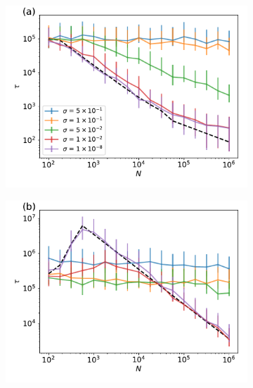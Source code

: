 \documentclass[10pt,twocolumn,twoside]{gsajnl}
\begin{document}
\begin{spacing}{1.5}
\begin{figure}[t]
\begin{subfigure}[b]{0.5\textwidth}
\includegraphics[width=\textwidth]{Figures/julia_weissman_5a.pdf}
\end{subfigure}
\begin{subfigure}[b]{0.5\textwidth}
\includegraphics[width=\textwidth]{Figures/julia_weissman_5b.pdf}
\end{subfigure}
\begin{subfigure}[c]{0.5\textwidth}

\end{subfigure}
\end{figure}
\end{spacing}
\end{document}
